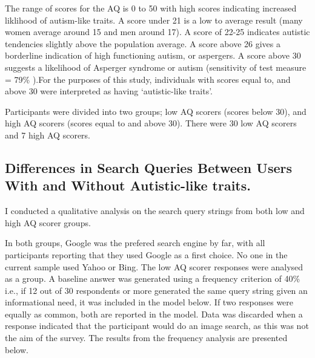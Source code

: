 \documentclass[a4paper, 11pt]{article}
\begin{document}
The range of scores for the AQ is 0 to 50 with high scores indicating increased liklihood of autism-like traits. A score under 21 is a low to average result (many women average around 15 and men around 17). A score of 22-25 indicates autistic tendencies slightly above the population average. A score above 26 gives a borderline indication of high functioning autism, or aspergers. A score above 30 suggests a likelihood of Asperger syndrome or autism (sensitivity of test measure = 79\% \cite{Baron Cohen et al}).For the purposes of this study, individuals with scores equal to, and above 30 were interpreted as having `autistic-like traits'.

Participants were divided into two groups; low AQ scorers (scores below 30), and high AQ scorers (scores equal to and above 30). There were 30 low AQ scorers and 7 high AQ scorers. 


\subsection{Differences in Search Queries Between Users With and Without Autistic-like traits.}
I conducted a qualitative analysis on the search query strings from both low and high AQ scorer groups.

In both groups, Google was the prefered search engine by far, with all participants reporting that they used Google as a first choice. No one in the current sample used Yahoo or Bing. 
The low AQ scorer responses were analysed as a group. A baseline answer was generated using a frequency criterion of 40\% i.e., if 12 out of 30 respondents or more generated the same query string given an informational need, it was included in the model below. If two responses were equally as common, both are reported in the model. Data was discarded when a response indicated that the participant would do an image search, as this was not the aim of the survey. The results from the frequency analysis are presented below.
\end{document}
